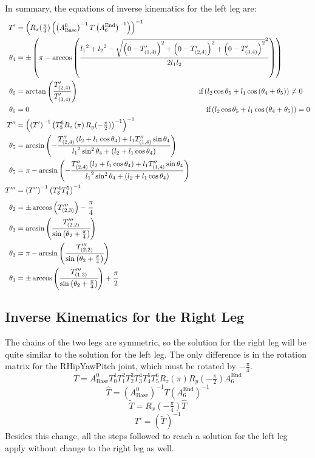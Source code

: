 In summary, the equations of inverse kinematics for the left leg are:
\begin{align*}
T' &= \left(R_x(\tfrac{\pi}{4})\left(\left(A^0_\text{Base}\right)^{-1} T \left(A^\text{End}_6\right)^{-1}\right)\right)^{-1} \\
\theta_4 &=\pm\left(\pi - \arccos\left(\frac{{l_1}^2 + {l_2}^2 - \sqrt{\left(0-T'_{(1,4)}\right)^2 + \left(0-T'_{(2,4)}\right)^2 + \left(0-T'_{(3,4)}\right)^2}^2}{2 l_1 l_2}\right)\right) \\
\theta_6 &= \arctan\left(\frac{T'_{(2,4)}}{T'_{(3,4)}}\right)\hspace{5.78cm}\text{if} \left(l_2\cos\theta_5 + l_1 \cos\left(\theta_4 + \theta_5\right)\right) \neq 0 \\
\theta_6 &= 0 \hspace{8.5cm} \text{if} \left(l_2\cos\theta_5 + l_1 \cos\left(\theta_4 + \theta_5\right)\right) = 0 \\
T'' &= \left(\left(T'\right)^{-1}\left(T^6_5R_z\left(\pi\right)R_y(-\tfrac{\pi}{2})\right)^{-1}\right)^{-1} \\
\theta_5 &= \arcsin\left(-\frac{T''_{(2,4)}\left(l_2+l_1\cos\theta_4\right) + l_1T''_{(1,4)}\sin\theta_4}{{l_1}^2\sin^2\theta_4 + \left(l_2 + l_1\cos\theta_4\right)}\right) \\
\theta_5 &= \pi - \arcsin\left(-\frac{T''_{(2,4)}\left(l_2+l_1\cos\theta_4\right) + l_1T''_{(1,4)}\sin\theta_4}{{l_1}^2\sin^2\theta_4 + \left(l_2 + l_1\cos\theta_4\right)}\right) \\
T''' &= \left(T''\right)^{-1}\left(T^4_3T^5_4\right)^{-1}\\
\theta_2 &= \pm\arccos\left(T'''_{(2,3)}\right) - \cfrac{\pi}{4} \\
\theta_3 &= \arcsin\left(\cfrac{T'''_{(2,2)}}{\sin\left(\theta_2+\frac{\pi}{4}\right)}\right) \\
\theta_3 &= \pi - \arcsin\left(\cfrac{T'''_{(2,2)}}{\sin\left(\theta_2+\frac{\pi}{4}\right)}\right) \\
\theta_1 &= \pm\arccos\left(\cfrac{T'''_{(1,3)}}{\sin\left(\theta_2+\frac{\pi}{4}\right)}\right) + \cfrac{\pi}{2}
\end{align*}







\subsection{Inverse Kinematics for the Right Leg}
The chains of the two legs are symmetric, so the solution for the right leg will be quite similar to the solution for the left leg. The only difference is in the rotation matrix for the RHipYawPitch joint, which must be rotated by $-\frac{\pi}{4}$.
\[
T = A^0_\text{Base}T^1_0T^2_1T^3_2T^4_3T^5_4T^6_5R_z(\pi)R_y(-\tfrac{\pi}{2})A^\text{End}_6
\]
\[
\widehat{T} = {\left(A^0_\text{Base}\right)}^{-1}T{\left(A^\text{End}_6\right)}^{-1}
\]
\[
\widetilde{T} = R_x(-\tfrac{\pi}{4}) \widehat{T}
\]
\[
T' = {\left(\widetilde{T}\right)}^{-1}
\]
Besides this change, all the steps followed to reach a solution for the left leg apply without change to the right leg as well. 

